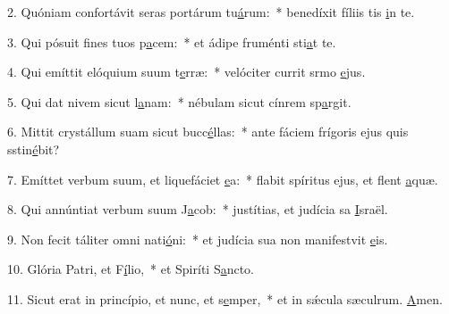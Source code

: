 2. Quóniam confortávit seras portárum tu\uline{á}rum:~* benedíxit fíliis tis \uline{i}n te.\par 
3. Qui pósuit fines tuos p\uline{a}cem:~* et ádipe fruménti sti\uline{a}t te.\par 
4. Qui emíttit elóquium suum t\uline{e}rræ:~* velóciter currit srmo \uline{e}jus.\par 
5. Qui dat nivem sicut l\uline{a}nam:~* nébulam sicut cínrem sp\uline{a}rgit.\par 
6. Mittit crystállum suam sicut bucc\uline{é}llas:~* ante fáciem frígoris ejus quis sstin\uline{é}bit?\par 
7. Emíttet verbum suum, et liquefáciet \uline{e}a:~* flabit spíritus ejus, et flent \uline{a}quæ.\par 
8. Qui annúntiat verbum suum J\uline{a}cob:~* justítias, et judícia sa \uline{I}sraël.\par 
9. Non fecit táliter omni nati\uline{ó}ni:~* et judícia sua non manifestvit \uline{e}is.\par 
10. Glória Patri, et F\uline{í}lio,~* et Spiríti S\uline{a}ncto.\par 
11. Sicut erat in princípio, et nunc, et s\uline{e}mper,~* et in sǽcula sæculrum. \uline{A}men.\par 
